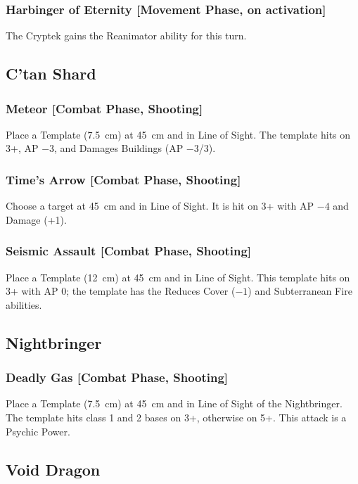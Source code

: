 \subsubsection{Harbinger of Eternity [Movement Phase, on activation]}

The Cryptek gains the Reanimator ability for this turn.

\subsection{C'tan Shard}

\subsubsection{Meteor [Combat Phase, Shooting]}

Place a Template (7.5~cm) at 45~cm and in Line of Sight. The template hits on 3+, AP $-3$, and Damages Buildings (AP $-3$/3).

\subsubsection{Time's Arrow [Combat Phase, Shooting]}

Choose a target at 45~cm and in Line of Sight. It is hit on 3+ with AP $-4$ and Damage (+1).

\subsubsection{Seismic Assault [Combat Phase, Shooting]}

Place a Template (12~cm) at 45~cm and in Line of Sight. This template hits on 3+ with AP 0; the template has the Reduces Cover ($-1$) and Subterranean Fire abilities.

\subsection{Nightbringer}

\subsubsection{Deadly Gas [Combat Phase, Shooting]}

Place a Template (7.5~cm) at 45~cm and in Line of Sight of the Nightbringer. The template hits class 1 and 2 bases on 3+, otherwise on 5+. This attack is a Psychic Power.

\subsection{Void Dragon}

